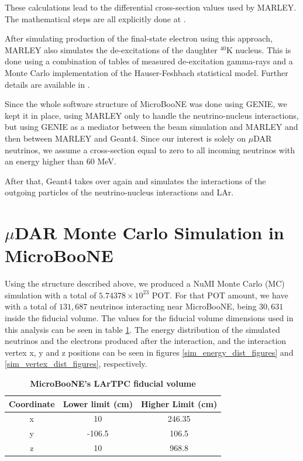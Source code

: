 These calculations lead to the differential cross-section values used by MARLEY. The mathematical steps are all explicitly done at \cite{Gardiner_thesis}. 

After simulating production of the final-state electron using this approach, MARLEY also simulates the de-excitations of the daughter $^{40}$K nucleus. This is done using a combination of tables of measured de-excitation gamma-rays and a Monte Carlo implementation of the Hauser-Feshbach statistical model. Further details are available in \cite{deexcitation-model}. 

Since the whole software structure of MicroBooNE was done using GENIE, we kept it in place, using MARLEY only to handle the neutrino-nucleus interactions, but using GENIE as a mediator between the beam simulation and MARLEY and then between MARLEY and Geant4. Since our interest is solely on $\mu$DAR neutrinos, we assume a cross-section equal to zero to all incoming neutrinos with an energy higher than $60$ MeV. 

After that, Geant4 takes over again and simulates the interactions of the outgoing particles of the neutrino-nucleus interactions and LAr. 

\section{$\mu$DAR Monte Carlo Simulation in MicroBooNE}

Using the structure described above, we produced a NuMI Monte Carlo (MC) simulation with a total of $5.74378 \times 10^{23}$ POT. For that POT amount, we have with a total of $131,687$ neutrinos interacting near MicroBooNE, being $30,631$ inside the fiducial volume. The values for the fiducial volume dimensions used in this analysis can be seen in table \ref{fiducial}. The energy distribution of the simulated neutrinos and the electrons produced after the interaction, and the interaction vertex x, y and z positions can be seen in figures \ref{sim_energy_dist_figures} and \ref{sim_vertex_dist_figures}, respectively.  

\begin{table}
	\begin{center}
		\begin{tabular}{ccc}
			\bottomrule
						 \textbf{Coordinate}	&	\textbf{Lower limit (cm)}	&	\textbf{Higher Limit (cm)}\\
			\toprule
			x &	10 & 246.35 \\ 
			y &	-106.5 & 106.5 \\
			z &	10 & 968.8 \\ 
			\toprule
		\end{tabular}
		\caption[MicroBooNE's LArTPC fiducial volume]{{\textbf{MicroBooNE's LArTPC fiducial volume}}}
		\label{fiducial}
	\end{center}
\end{table}

